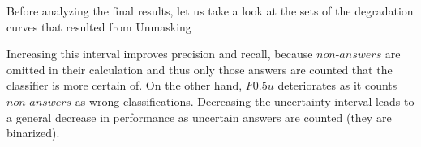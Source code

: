 Before analyzing the final results, let us take a look at the sets of the degradation curves that resulted from Unmasking

Increasing this interval improves precision and recall, because $non$-$answers$ are omitted in their calculation and thus only those answers are counted that the classifier is more certain of.
On the other hand, $F0.5u$ deteriorates as it counts $non$-$answers$ as wrong classifications.
Decreasing the uncertainty interval leads to a general decrease in performance as uncertain answers are counted  (they are binarized).









